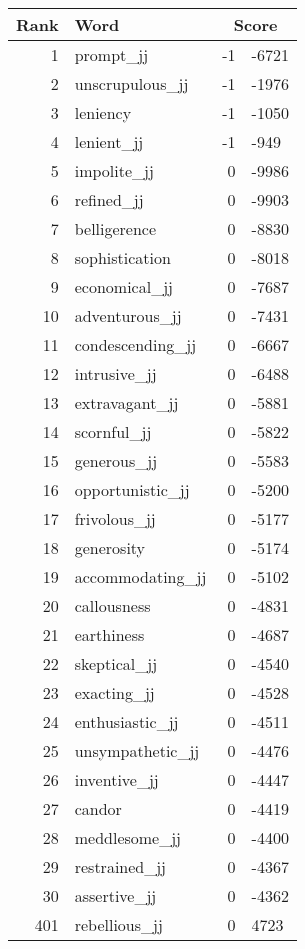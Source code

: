 \begin{longtable}[!htbp]{| rlr@{.}l |}
    \hline
    \textbf{Rank} & \textbf{Word} & \multicolumn{2}{c|}{\textbf{Score}} \\
    \hline
    \endhead
    1 & prompt\_jj & -1 & -6721 \\
    2 & unscrupulous\_jj & -1 & -1976 \\
    3 & leniency & -1 & -1050 \\
    4 & lenient\_jj & -1 & -949 \\
    5 & impolite\_jj & 0 & -9986 \\
    6 & refined\_jj & 0 & -9903 \\
    7 & belligerence & 0 & -8830 \\
    8 & sophistication & 0 & -8018 \\
    9 & economical\_jj & 0 & -7687 \\
    10 & adventurous\_jj & 0 & -7431 \\
    11 & condescending\_jj & 0 & -6667 \\
    12 & intrusive\_jj & 0 & -6488 \\
    13 & extravagant\_jj & 0 & -5881 \\
    14 & scornful\_jj & 0 & -5822 \\
    15 & generous\_jj & 0 & -5583 \\
    16 & opportunistic\_jj & 0 & -5200 \\
    17 & frivolous\_jj & 0 & -5177 \\
    18 & generosity & 0 & -5174 \\
    19 & accommodating\_jj & 0 & -5102 \\
    20 & callousness & 0 & -4831 \\
    21 & earthiness & 0 & -4687 \\
    22 & skeptical\_jj & 0 & -4540 \\
    23 & exacting\_jj & 0 & -4528 \\
    24 & enthusiastic\_jj & 0 & -4511 \\
    25 & unsympathetic\_jj & 0 & -4476 \\
    26 & inventive\_jj & 0 & -4447 \\
    27 & candor & 0 & -4419 \\
    28 & meddlesome\_jj & 0 & -4400 \\
    29 & restrained\_jj & 0 & -4367 \\
    30 & assertive\_jj & 0 & -4362 \\
    401 & rebellious\_jj & 0 & 4723 \\

\end{longtable}
